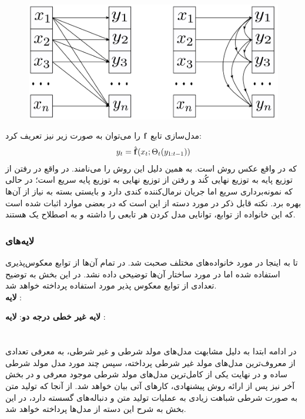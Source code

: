 \begin{figure}[H]
    \centering
    \includegraphics[width=.5\textwidth]{images/flow-survey2.png}
    \caption{
    }
\end{figure}

مدل‌سازی تابع \autoregressive{} 
${\bf f}$
را می‌توان به صورت زیر نیز تعریف کرد:
\begin{align}
y_t = \hat{{\bf f}}(x_t; \Theta_t(y_{1:t-1}))
\end{align}
که در واقع عکس روش  است. به همین دلیل این روش را  می‌نامند. در واقع در  رفتن از توزیع پایه به توزیع نهایی کُند و رفتن از توزیع نهایی به توزیع پایه سریع است؛ در حالی که  نمونه‌برداری سریع اما جریان نرمال‌کننده کندی دارد و بایستی بسته به نیاز از آن‌ها بهره برد. 
نکته قابل ذکر در مورد دسته \autoregressive{}  از \normalizingflownets{} این است که در  بعضی موارد اثبات شده است که این خانواده از توابع، توانایی مدل کردن هر تابعی را داشته و به اصطلاح یک
هستند.
\subsubsection{لایه‌های \coupling{}}
تا به اینجا در مورد خانواده‌های مختلف \normalizingflownets{} صحبت شد. در تمام آن‌ها از توابع معکوس‌پذیری استفاده شده اما در مورد ساختار آن‌ها توضیحی داده نشد. در این بخش به توضیح تعدادی از توابع معکوس پذیر مورد استفاده پرداخته خواهد شد.
\\
\textbf{لایه 
    \coupling{} }:

\textbf{لایه \coupling{}
    غیر خطی درجه دو}:
\textbf{لایه \coupling{}
   }:
\section{\condtg}
در ادامه ابتدا به دلیل مشابهت مدل‌های مولد شرطی و غیر شرطی، به معرفی تعدادی از معروف‌ترین مدل‌های مولد غیر شرطی پرداخته، سپس چند مورد مدل مولد شرطی ساده و در نهایت یکی از کامل‌ترین مدل‌های مولد شرطی موجود معرفی و در بخش آخر نیز پس از ارائه روش پیشنهادی، کارهای آتی بیان خواهد شد.
از آنجا که تولید متن به صورت شرطی شباهت زیادی به عملیات تولید متن و دنباله‌های گسسته دارد، در این بخش به شرح این دسته از مدل‌ها پرداخته خواهد شد.

